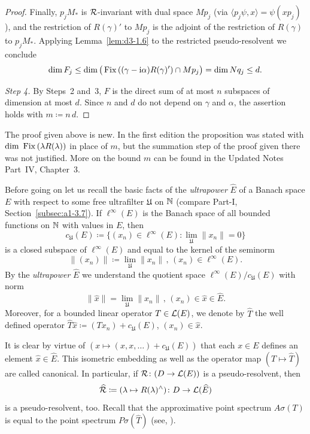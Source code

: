 \begin{proof}
Finally, $p_{j}M_{*}$ is $\mathcal{R}$-invariant with dual space $Mp_{j}$ (via $\langle p_{j}\psi, x \rangle = \psi(xp_{j})$), and the restriction of\/ $R(\gamma)'$ to $Mp_{j}$ is the adjoint of the restriction of\/ $R(\gamma)$ to $p_{j}M_{*}$.
Applying Lemma~\ref{lem:d3-1.6} to the restricted pseudo-resolvent we conclude
\[
	\dim F_{j} 
	\leq \dim \bigl( \Fix{(\gamma - \im\alpha)R(\gamma)'} \cap Mp_{j} \bigr) 
	= \dim Nq_{j} 
	\leq d .
\]

\emph{Step 4.}
By Steps~2 and~3, $F$ is the direct sum of at most $n$ subspaces of dimension at most $d$.
Since $n$ and $d$ do not depend on $\gamma$ and $\alpha$, the assertion holds with $m \coloneq n\,d$.
\end{proof}
\begin{remark*}
The proof given above is new.
In the first edition the proposition was stated with $\mathop{}\!\mathrm{dim}\, \mathop{}\mathrm{Fix}\left(\lambda R(\lambda)\right)$ in place of $m$, but the summation step of the proof given there was not justified.
More on the bound $m$ can be found in the Updated Notes Part~IV, Chapter~3.
\end{remark*}
Before going on let us recall the basic facts of the \emph{ultrapower} $\widehat{E}$ of a Banach space $E$ with respect to some free ultrafilter $\mathfrak{U}$ on $\mathbb{N} $ (compare Part-I, Section~\ref{subsec:a1-3.7}).
If\/ $\ell^{\infty}(E)$ is the Banach space of all bounded functions on $\mathbb{N} $ with values in $E$, then
\[
c_{\mathfrak{U}}(E) \coloneq \{(x_{n}) \in \ell^{\infty}(E) \colon \lim_{\mathfrak{U}}\|x_{n}\| = 0\}
\]
is a closed subspace of\/ $\ell^{\infty}(E)$ and equal to the kernel of the seminorm
\[
\|(x_{n})\| \coloneq \lim_{\mathfrak{U}}\|x_{n}\| \, , \, (x_{n}) \in \ell^{\infty}(E).
\]
By the \emph{ultrapower} $\widehat{E}$ we understand the quotient space $\ell^{\infty}(E)/c_{\mathfrak{U}}(E)$ with norm
\[
\|\hat{x}\| = \lim_{\mathfrak{U}}\|x_{n}\| \, , \, (x_{n}) \in \hat{x} \in \widehat{E}.
\]
Moreover, for a bounded linear operator $T \in \mathcal{L}(E)$, we denote by $\widehat{T}$ the well defined operator $\widehat{T}\hat{x} \coloneq (Tx_{n}) + c_{\mathfrak{U}}(E)$, $(x_{n}) \in \hat{x}$.

It is clear by virtue of\/ $(x \mapsto (x, x, \dots) + c_{\mathfrak{U}}(E))$ that each $x \in E$ defines an element $\hat{x} \in \widehat{E}$.
This isometric embedding as well as the operator map $(T \mapsto \widehat{T})$ are called canonical.
In particular, if\/ $\mathcal{R} \colon (D \to \mathcal{L}(E))$ is a pseudo-resolvent, then
\[
\widehat{\mathcal{R}} \coloneq (\lambda \mapsto R(\lambda)^{\wedge}) \colon D \to \mathcal{L}(\widehat{E})
\]
is a pseudo-resolvent, too.
Recall that the approximative point spectrum $A{\sigma}(T)$ is equal to the point spectrum $P{\sigma}(\widehat{T})$ (see, \eg \textcite[Chapter V, §1]{schaefer:1974}).

